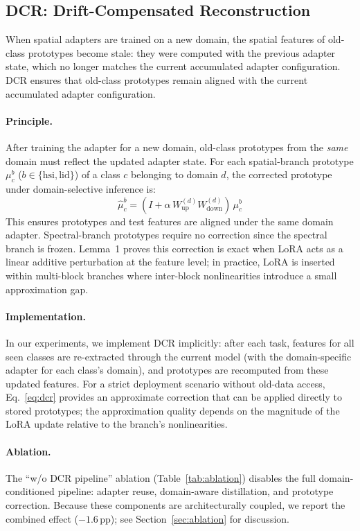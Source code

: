 \subsection{DCR: Drift-Compensated Reconstruction}
\label{sec:dcr}

When spatial adapters are trained on a new domain, the spatial features of old-class prototypes become stale: they were computed with the previous adapter state, which no longer matches the current accumulated adapter configuration.
DCR ensures that old-class prototypes remain aligned with the current accumulated adapter configuration.

\paragraph{Principle.}
After training the adapter for a new domain, old-class prototypes from the \emph{same} domain must reflect the updated adapter state.
For each spatial-branch prototype $\mu_c^b$ ($b \in \{\mathrm{hsi}, \mathrm{lid}\}$) of a class $c$ belonging to domain $d$, the corrected prototype under domain-selective inference is:
\begin{equation}
    \hat{\mu}_c^b = (I + \alpha\, W_{\mathrm{up}}^{(d)} W_{\mathrm{down}}^{(d)})\, \mu_c^b
\label{eq:dcr}
\end{equation}
This ensures prototypes and test features are aligned under the same domain adapter.
Spectral-branch prototypes require no correction since the spectral branch is frozen.
Lemma~1 proves this correction is exact when LoRA acts as a linear additive perturbation at the feature level; in practice, LoRA is inserted within multi-block branches where inter-block nonlinearities introduce a small approximation gap.

\paragraph{Implementation.}
In our experiments, we implement DCR implicitly: after each task, features for all seen classes are re-extracted through the current model (with the domain-specific adapter for each class's domain), and prototypes are recomputed from these updated features.
For a strict deployment scenario without old-data access, Eq.~\eqref{eq:dcr} provides an approximate correction that can be applied directly to stored prototypes; the approximation quality depends on the magnitude of the LoRA update relative to the branch's nonlinearities.

\paragraph{Ablation.}
The ``w/o DCR pipeline'' ablation (Table~\ref{tab:ablation}) disables the full domain-conditioned pipeline: adapter reuse, domain-aware distillation, and prototype correction.
Because these components are architecturally coupled, we report the combined effect ($-1.6$\,pp); see Section~\ref{sec:ablation} for discussion.

